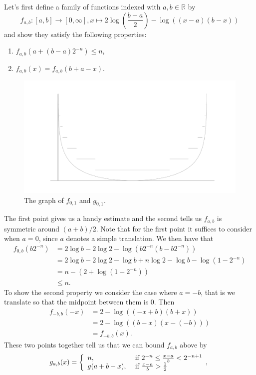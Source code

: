 \documentclass[a4paper,12pt,twoside,BCOR=10mm]{scrbook}
\theoremstyle{definition}
\theoremstyle{definition}
\theoremstyle{definition}
\begin{document}
Let's first define a family of functions indexed with $a, b \in \mathbb{R}$ by
\[
	f_{a, b}: [a, b] \rightarrow [0, \infty],
	x \mapsto 2\log \left ( \frac{b - a}{2} \right ) - \log((x - a)(b - x))
\]
and show they satisfy the following properties:
\begin{enumerate}
\item
$f_{a, b}(a + (b - a)2^{-n}) \leq n$,
\item
$f_{a, b}(x) = f_{a, b}(b + a - x)$.
\end{enumerate}
\begin{figure}[h]
\centering
\includegraphics[width=1\textwidth]{graph2}
\caption{The graph of $f_{0, 1}$ and $g_{0, 1}$.}
\end{figure}
The first point gives us a handy estimate and the second tells us $f_{a, b}$ is symmetric around $(a + b)/2$.
Note that for the first point it suffices to consider when $a = 0$, since $a$ denotes a simple translation.
We then have that
\begin{align*}
	f_{0, b}(b2^{-n})
	&= 2\log b - 2\log 2 - \log (b2^{-n}(b - b2^{-n}))\\
	&= 2\log b - 2\log 2 - \log b + n\log 2 - \log b - \log (1 - 2^{-n})\\
	&= n - (2 + \log (1 - 2^{-n}))\\
	&\leq n.
\end{align*}
To show the second property we consider the case where $a = -b$, that is we translate so that the midpoint between them is $0$.
Then
\begin{align*}
f_{-b, b}(-x)
&= 2 - \log ((-x + b)(b + x))\\
&= 2 - \log ((b - x)(x - (-b)))\\
&= f_{-b, b}(x).
\end{align*}
These two points together tell us that we can bound $f_{a, b}$ above by
\[
	g_{a, b}(x) =
	\left \{
	\begin{array}{l l}
	n, & \text{ if } 2^{-n} \leq \frac{x - a}{b} < 2^{-n + 1}\\
	g(a + b - x) , & \text{ if } \frac{x - a}{b} > \frac{1}{2}
	\end{array},
	\right .
\]
\end{document}
